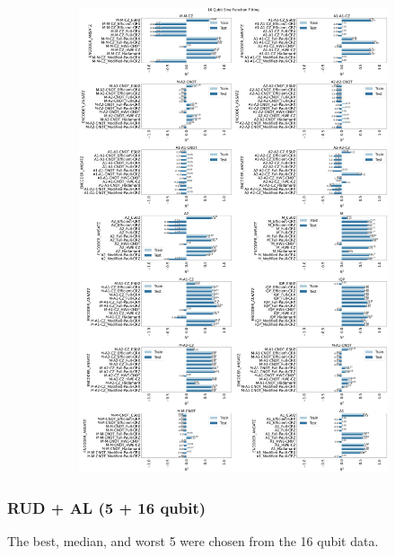 \documentclass[journal=jacsat,manuscript=article]{achemso}
\begin{document}
\begin{figure}[H]
\begin{subfigure}[b]{\textwidth}
		\includegraphics[width=\textwidth]{images/Function_Fitting/16qubit_Sine_funcfit_R2.png}
		\caption{}
		\label{fig:16qubit_Sine_funcfit_R2}
	\end{subfigure}
	\caption{}
	\label{fig:16qubit_Func_funcfit_R2}
\end{figure}



\subsubsection{RUD + AL (5 + 16 qubit)}\label{subsection:func_depth}
The best, median, and worst 5 were chosen from the 16 qubit data.
\end{document}
